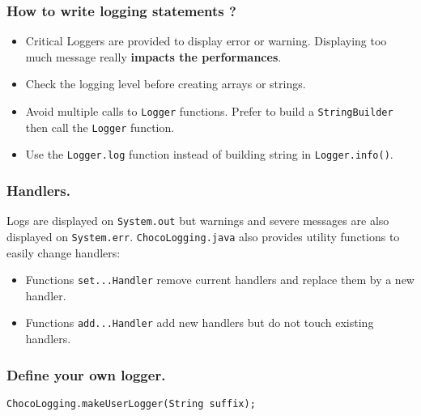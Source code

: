 \subsubsection{How to write logging statements ?}\label{advanced:howtowriteloggingstatements}\hypertarget{advanced:howtowriteloggingstatements}{}

\begin{itemize}
	\item Critical Loggers are provided to display error or warning. Displaying too much message really \textbf{impacts the performances}.
	\item Check the logging level before creating arrays or strings.
	\item Avoid multiple calls to \texttt{Logger} functions. Prefer to build a \texttt{StringBuilder} then call the \texttt{Logger} function.
	\item Use the \texttt{Logger.log} function instead of building string in \texttt{Logger.info()}.
\end{itemize}

\subsubsection{Handlers.}\label{advanced:handlers}\hypertarget{advanced:handlers}{}
Logs are displayed on \texttt{System.out} but warnings and severe messages are also displayed on \texttt{System.err}.
\texttt{ChocoLogging.java} also provides utility functions to easily change handlers:
\begin{itemize}
	\item Functions \texttt{set...Handler} remove current handlers and replace them by a new handler.
	\item Functions \texttt{add...Handler} add new handlers but do not touch existing handlers.
\end{itemize}

\subsubsection{Define your own logger.}\label{advanced:defineyourownlogger}\hypertarget{advanced:defineyourownlogger}{}
\begin{lstlisting}
ChocoLogging.makeUserLogger(String suffix);
\end{lstlisting}

	
